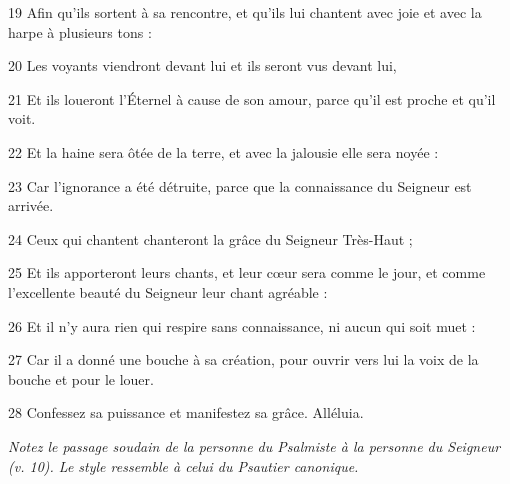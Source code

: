 \par 19 Afin qu'ils sortent à sa rencontre, et qu'ils lui chantent avec joie et avec la harpe à plusieurs tons :
\par 20 Les voyants viendront devant lui et ils seront vus devant lui,
\par 21 Et ils loueront l'Éternel à cause de son amour, parce qu'il est proche et qu'il voit.
\par 22 Et la haine sera ôtée de la terre, et avec la jalousie elle sera noyée :
\par 23 Car l'ignorance a été détruite, parce que la connaissance du Seigneur est arrivée.
\par 24 Ceux qui chantent chanteront la grâce du Seigneur Très-Haut ;
\par 25 Et ils apporteront leurs chants, et leur cœur sera comme le jour, et comme l'excellente beauté du Seigneur leur chant agréable :
\par 26 Et il n'y aura rien qui respire sans connaissance, ni aucun qui soit muet :
\par 27 Car il a donné une bouche à sa création, pour ouvrir vers lui la voix de la bouche et pour le louer.
\par 28 Confessez sa puissance et manifestez sa grâce. Alléluia.


\par \textit{Notez le passage soudain de la personne du Psalmiste à la personne du Seigneur (v. 10). Le style ressemble à celui du Psautier canonique.}

